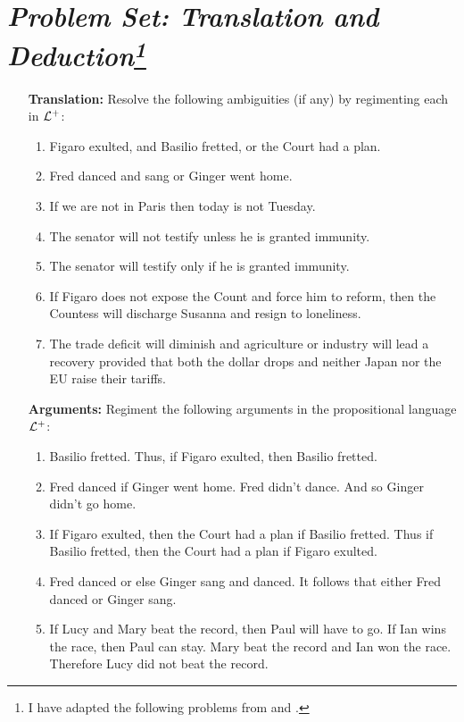 \documentclass[a4paper, 11pt]{article} %
\begin{document}
\section*{\it Problem Set: Translation and Deduction\footnote{I have adapted the following problems from \citet{Goldfarb2003} and \citet{Laboreo2005}.}}

\begin{enumerate}[leftmargin=1.2in,labelsep=.15in] 
\item[\bf Translation:] Resolve the following ambiguities (if any) by regimenting each in $\mathcal{L}^+$:
	\begin{enumerate}[label=(\arabic*)]\small
	\item Figaro exulted, and Basilio fretted, or the Court had a plan.
	\item Fred danced and sang or Ginger went home.
	\item If we are not in Paris then today is not Tuesday.
	\item The senator will not testify unless he is granted immunity.
	\item The senator will testify only if he is granted immunity.
	\item If Figaro does not expose the Count and force him to reform, then the Countess will discharge Susanna and resign to loneliness.
	\item The trade deficit will diminish and agriculture or industry will lead a recovery provided that both the dollar drops and neither Japan nor the EU raise their tariffs.
	\end{enumerate}
\item[\bf Arguments:] Regiment the following arguments in the propositional language $\mathcal{L}^+$:
	\begin{enumerate}[label=(\arabic*)]\small
	\item Basilio fretted. Thus, if Figaro exulted, then Basilio fretted.
	\item Fred danced if Ginger went home. Fred didn't dance. And so Ginger didn't go home.
	\item If Figaro exulted, then the Court had a plan if Basilio fretted. Thus if Basilio fretted, then the Court had a plan if Figaro exulted.
	\item Fred danced or else Ginger sang and danced. It follows that either Fred danced or Ginger sang.
	\item If Lucy and Mary beat the record, then Paul will have to go. If Ian wins the race, then Paul can stay. Mary beat the record and Ian won the race. Therefore Lucy did not beat the record.

\end{enumerate}
\end{enumerate}
\end{document}
